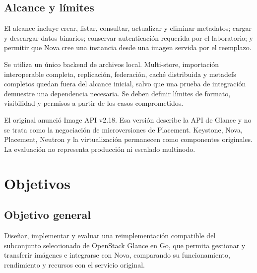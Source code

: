 \documentclass[12pt,a4paper]{article}
\begin{document}
\subsection{Alcance y límites}
El alcance incluye crear, listar, consultar, actualizar y eliminar metadatos; cargar y descargar datos binarios; conservar autenticación requerida por el laboratorio; y permitir que Nova cree una instancia desde una imagen servida por el reemplazo.

Se utiliza un único backend de archivos local. Multi-store, importación interoperable completa, replicación, federación, caché distribuida y metadefs completos quedan fuera del alcance inicial, salvo que una prueba de integración demuestre una dependencia necesaria. Se deben definir límites de formato, visibilidad y permisos a partir de los casos comprometidos.

El original anunció Image API v2.18. Esa versión describe la API de Glance y no se trata como la negociación de microversiones de Placement. Keystone, Nova, Placement, Neutron y la virtualización permanecen como componentes originales. La evaluación no representa producción ni escalado multinodo.

\Needspace{165pt}
\section{Objetivos}
\subsection{Objetivo general}
Diseñar, implementar y evaluar una reimplementación compatible del subconjunto seleccionado de OpenStack Glance en Go, que permita gestionar y transferir imágenes e integrarse con Nova, comparando su funcionamiento, rendimiento y recursos con el servicio original.
\end{document}
